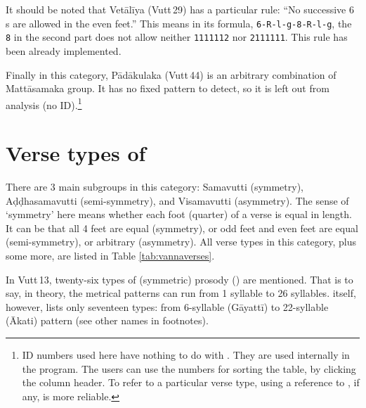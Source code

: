 It should be noted that Vetālīya (Vutt\,29) has a particular rule: ``No successive 6 s are allowed in the even feet.'' This means in its formula, \texttt{6-R-l-g-8-R-l-g}, the \texttt{8} in the second part does not allow neither \texttt{1111112} nor \texttt{2111111}. This rule has been already implemented.

Finally in this category, Pādākulaka (Vutt\,44) is an arbitrary combination of Mattāsamaka group. It has no fixed pattern to detect, so it is left out from analysis (no ID).\footnote{ID numbers used here have nothing to do with . They are used internally in the program. The users can use the numbers for sorting the table, by clicking the column header. To refer to a particular verse type, using a reference to , if any, is more reliable.}

\section{Verse types of }

There are 3 main subgroups in this category: Samavutti (symmetry), Aḍḍhasamavutti (semi-symmetry), and Visamavutti (asymmetry). The sense of `symmetry' here means whether each foot (quarter) of a verse is equal in length. It can be that all 4 feet are equal (symmetry), or odd feet and even feet are equal (semi-symmetry), or arbitrary (asymmetry). All verse types in this category, plus some more, are listed in Table \ref{tab:vannaverses}.

In Vutt\,13, twenty-six types of (symmetric) prosody () are mentioned. That is to say, in theory, the metrical patterns can run from 1 syllable to 26 syllables.  itself, however, lists only seventeen types: from 6-syllable (Gāyattī) to 22-syllable (Ākati) pattern (see other names in footnotes).


